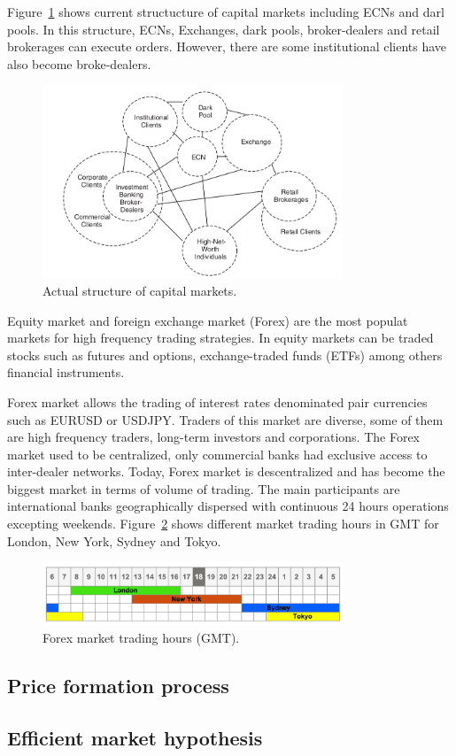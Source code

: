 Figure~\ref{fig:capitalmarketnow} shows current structucture of capital markets
including ECNs and darl pools. In this structure, ECNs, Exchanges, dark pools,
broker-dealers and retail brokerages can execute orders. However, there are some
institutional clients have also become broke-dealers.

\begin{figure}[!h]
  \centering
  \includegraphics[width=0.8\textwidth]{img/capitalmarketsnow}
  \caption{Actual structure of capital markets.}
  \label{fig:capitalmarketnow}
\end{figure}



Equity market and foreign exchange market (Forex) are the most populat markets
for high frequency trading strategies. In equity markets can be traded stocks
such as futures and options, exchange-traded funds (ETFs) among others financial
instruments.

Forex market allows the trading of interest rates denominated pair currencies
such as EURUSD or USDJPY. Traders of this market are diverse, some of them are
high frequency traders, long-term investors and corporations. The Forex market
used to be centralized, only commercial banks had exclusive access to
inter-dealer networks. Today, Forex market is descentralized and has become the
biggest market in terms of volume of trading. The main participants are
international banks geographically dispersed with continuous 24 hours operations
excepting weekends. Figure~\ref{fig:Forextimes} shows different market trading
hours in GMT for London, New York, Sydney and Tokyo.

\begin{figure}[!h]
  \centering
  \includegraphics[width=0.8\textwidth]{img/forex-trading-hours}
  \caption{Forex market trading hours (GMT).}
  \label{fig:Forextimes}
\end{figure}

\subsection{Price formation process}


\subsection{Efficient market hypothesis}


